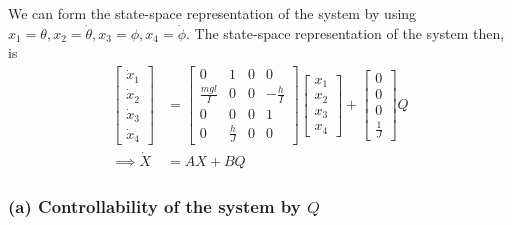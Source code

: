 We can form the state-space representation of the system by using \( x_1=\theta, x_2=\dot{\theta}, x_3=\phi, x_4=\dot{\phi} \).
The state-space representation of the system then, is
\begin{align*}
    \begin{bmatrix}
        \dot{x}_1 \\ \dot{x}_2 \\ \dot{x}_3 \\ \dot{x}_4
    \end{bmatrix}
     & =
    \begin{bmatrix}
        0               & 1           & 0 & 0            \\
        \frac{m g l}{I} & 0           & 0 & -\frac{h}{I} \\
        0               & 0           & 0 & 1            \\
        0               & \frac{h}{J} & 0 & 0
    \end{bmatrix}
    \begin{bmatrix}
        x_1 \\ x_2 \\ x_3 \\ x_4
    \end{bmatrix}
    +
    \begin{bmatrix}
        0 \\ 0 \\ 0 \\ \frac{1}{J}
    \end{bmatrix} Q
    \\
    \implies
    \dot X
     & =
    A X + B Q
\end{align*}

\clearpage
\subsubsection*{(a) Controllability of the system by \( Q \)}

